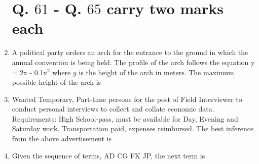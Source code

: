 \documentclass[journal]{IEEEtran}
\begin{document}
\begin{enumerate}
\section*{Q. $61$ - Q. $65$ carry two marks each}

\item A political party orders an arch for the entrance to the ground in which the annual convention is being held. The profile of the arch follows the equation y = 2x - 0.1x$^{2}$ where $y$ is the height of the arch in meters. The maximum possible height of the arch is \hfill {}
\begin{enumerate}
\end{enumerate}

\item Wanted Temporary, Part-time persons for the post of Field Interviewer to conduct personal interviews to collect and collate economic data. Requirements: High School-pass, must be available for Day, Evening and Saturday work. Transportation paid, expenses reimbursed. The best inference from the above advertisement is \hfill {}
\begin{enumerate}
\end{enumerate}

\item Given the sequence of terms, AD  CG  FK  JP, the next term is \hfill {}
\begin{enumerate}
\end{enumerate}


\end{enumerate}
\end{document}
